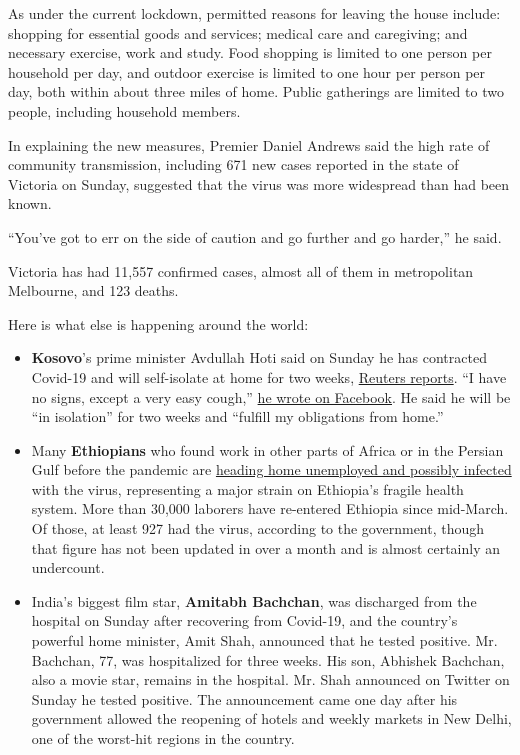 As under the current lockdown, permitted reasons for leaving the house
include: shopping for essential goods and services; medical care and
caregiving; and necessary exercise, work and study. Food shopping is
limited to one person per household per day, and outdoor exercise is
limited to one hour per person per day, both within about three miles of
home. Public gatherings are limited to two people, including household
members.

In explaining the new measures, Premier Daniel Andrews said the high
rate of community transmission, including 671 new cases reported in the
state of Victoria on Sunday, suggested that the virus was more
widespread than had been known.

``You've got to err on the side of caution and go further and go
harder,'' he said.

Victoria has had 11,557 confirmed cases, almost all of them in
metropolitan Melbourne, and 123 deaths.

Here is what else is happening around the world:

\begin{itemize}
\item
  \textbf{Kosovo}'s prime minister Avdullah Hoti said on Sunday he has
  contracted Covid-19 and will self-isolate at home for two weeks,
  \href{https://www.reuters.com/article/us-health-coronavirus-kosovo-primeminist/kosovo-prime-minister-says-he-has-covid-19-idUSKBN24Y0ON}{Reuters
  reports}. ``I have no signs, except a very easy cough,''
  \href{https://www.facebook.com/avdullah.hoti/posts/3508635622531100}{he
  wrote on Facebook}. He said he will be ``in isolation'' for two weeks
  and ``fulfill my obligations from home.''
\item
  Many \textbf{Ethiopians} who found work in other parts of Africa or in
  the Persian Gulf before the pandemic are
  \href{https://www.nytimes.com/2020/08/01/world/africa/ethiopian-migrant-workers-coronavirus.html?action=click\&module=RelatedLinks\&pgtype=Article}{heading
  home unemployed and possibly infected} with the virus, representing a
  major strain on Ethiopia's fragile health system. More than 30,000
  laborers have re-entered Ethiopia since mid-March. Of those, at least
  927 had the virus, according to the government, though that figure has
  not been updated in over a month and is almost certainly an
  undercount.
\item
  India's biggest film star, \textbf{Amitabh Bachchan}, was discharged
  from the hospital on Sunday after recovering from Covid-19, and the
  country's powerful home minister, Amit Shah, announced that he tested
  positive. Mr. Bachchan, 77, was hospitalized for three weeks. His son,
  Abhishek Bachchan, also a movie star, remains in the hospital. Mr.
  Shah announced on Twitter on Sunday he tested positive. The
  announcement came one day after his government allowed the reopening
  of hotels and weekly markets in New Delhi, one of the worst-hit
  regions in the country.
\end{itemize}

